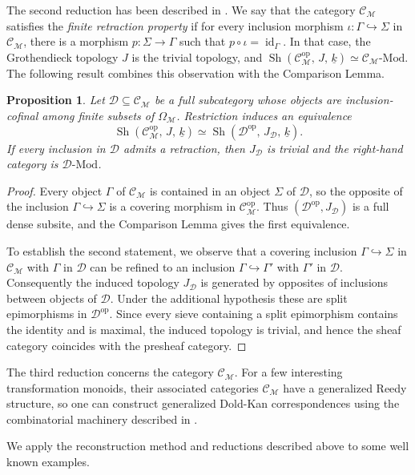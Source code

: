 \documentclass[10pt, reqno]{amsart}
\theoremstyle{plain}
\newtheorem{proposition}[theorem]{Proposition}
\numberwithin{equation}{section}
\theoremstyle{definition}
\newcommand{\Sh}{\operatorname{Sh}}
\newcommand{\Mod}{{\textrm{-}\mathrm{Mod}}}
\newcommand{\id}{\operatorname{id}}
\newcommand{\op}{\mathrm{op}}
\newcommand{\M}{\mathscr M}
\newcommand{\C}{\mathscr C}
\newcommand{\D}{\mathscr D}
\begin{document}
The second reduction has been described in \cite{LiRel}. We say that the category $\C_\M$ satisfies the \emph{finite retraction property} if for every inclusion morphism $\iota: \Gamma \hookrightarrow \Sigma$ in $\C_\M$, there is a morphism $p: \Sigma \to \Gamma$ such that $p \circ \iota = \id_\Gamma$. In that case, the Grothendieck topology $J$ is the trivial topology, and $\Sh(\C_\M^{\op}, \, J, \, \underline{k}) \simeq \C_\M \Mod$. The following result combines this observation with the Comparison Lemma.

\begin{proposition}\label{prop:cofinal-retractions}
Let $ \D \subseteq \C_\M$ be a full subcategory whose objects are inclusion-cofinal among finite subsets of $\Omega_\M$. Restriction induces an equivalence
\[
\Sh(\C_\M^{\op}, \, J, \, \underline{k}) \simeq \Sh(\D^{\op}, \, J_{\D}, \, \underline{k}).
\]
If every inclusion in $\D$ admits a retraction, then $J_{\D}$ is trivial and the right-hand category is $\D\Mod$.
\end{proposition}

\begin{proof}
Every object $\Gamma$ of $\C_\M$ is contained in an object $\Sigma$ of $\D$, so the opposite of the inclusion $\Gamma \hookrightarrow \Sigma$ is a covering morphism in $\C_\M^{\op}$. Thus $(\D^{\op}, J_{\D})$ is a full dense subsite, and the Comparison Lemma gives the first equivalence.

To establish the second statement, we observe that a covering inclusion $\Gamma \hookrightarrow \Sigma$ in $\C_\M$ with $\Gamma$ in $\D$ can be refined to an inclusion $\Gamma \hookrightarrow \Gamma'$ with $\Gamma'$ in $\D$. Consequently the induced topology $J_\D$ is generated by opposites of inclusions between objects of $\D$. Under the additional hypothesis these are split epimorphisms in $\D^{\op}$. Since every sieve containing a split epimorphism contains the identity and is maximal, the induced topology is trivial, and hence the sheaf category coincides with the presheaf category.
\end{proof}

The third reduction concerns the category $\C_\M$. For a few interesting transformation monoids, their associated categories $\C_\M$ have a generalized Reedy structure, so one can construct generalized Dold-Kan correspondences using the combinatorial machinery described in \cite{LiHom, LiNorm}.

We apply the reconstruction method and reductions described above to some well known examples.
\end{document}
